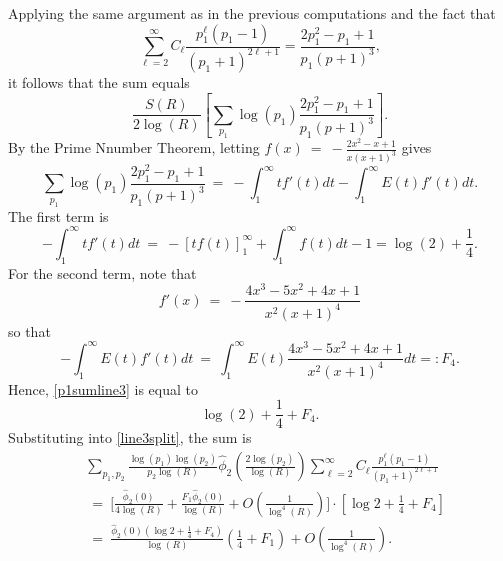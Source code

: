 \documentclass[11pt, reqno]{amsart}
\makeatletter
\renewenvironment{proof}[1][\proofname]{\par
  \vspace{-.7\topsep}%
  \pushQED{\qed}%
  \normalfont
  \topsep0pt \partopsep0pt %
  \trivlist
  \item[\hskip\labelsep
        \itshape
    #1\@addpunct{.}]\ignorespaces
}{%
  \popQED\endtrivlist\@endpefalse
  \addvspace{6pt plus 6pt} %
}
\theoremstyle{definition}
\theoremstyle{remark}
\numberwithin{equation}{section}
\renewcommand{\hat}{\widehat}
\makeatother
\begin{document}
\begin{proof}
    Applying the same argument as in the previous computations and the fact that
    \begin{equation}
        \sum_{\ell =2}^\infty C_\ell \frac{p_1^\ell (p_1-1)}{(p_1+1)^{2\ell+1}}=\frac{2p_1^2-p_1+1}{p_1(p+1)^3},
    \end{equation}
    it follows that the sum equals
    \begin{equation}\label{line3split}
        \frac{S(R)}{2\log(R)}\left[\sum_{p_1}\log(p_1) \frac{2p_1^2-p_1+1}{p_1(p+1)^3}\right].
    \end{equation}
By the Prime Nnumber Theorem, letting $f(x) \ = \ -\frac{2x^2-x+1}{x(x+1)^3}$ gives
\begin{equation}\label{p1sumline3}
    \sum_{p_1}\log(p_1) \frac{2p_1^2-p_1+1}{p_1(p+1)^3} \ =\ -\int_1^\infty tf'(t)dt-\int_1^\infty E(t)f'(t)dt.
\end{equation}
The first term is
\begin{equation}
    -\int_1^\infty tf'(t)dt \ = \ -[tf(t)]_1^\infty+\int_1^\infty f(t)dt-1=\log(2)+\frac{1}{4}.
\end{equation}
For the second term, note that
\begin{equation}
    f'(x) \ =\ -\frac{4x^{3} - 5x^{2} + 4x + 1}{x^{2} \left(x + 1\right)^{4}}
\end{equation}
so that
\begin{equation}
    -\int_1^\infty E(t)f'(t)dt \ = \ \int_1^\infty E(t)\frac{4x^{3} - 5x^{2} + 4x + 1}{x^{2} \left(x + 1\right)^{4}}dt=:F_4.
\end{equation}
Hence, \eqref{p1sumline3} is equal to
\begin{equation}
    \log (2)+\frac{1}{4}+F_4.
\end{equation}
Substituting into \eqref{line3split}, the sum is
    \begin{equation}
        \begin{aligned}
        & \sum_{p_1,p_2} \frac{\log(p_1)\log(p_2)}{p_2\log(R)}\hat\phi_2\left(\frac{2\log(p_2)}{\log(R)}\right) \sum_{\ell=2}^\infty C_\ell \frac{p_1^\ell(p_1-1)}{(p_1+1)^{2\ell +1}}\\
        & \ = \ \bigg[\frac{\hat\phi_2(0)}{4\log(R)}+\frac{F_1\hat\phi_2(0)}{\log(R)}+ O\left(\frac{1}{\log^4(R)}\right)\bigg]\cdot\left[\log 2 +\frac{1}{4}+F_4\right]\\
        & \ = \ \frac{\hat\phi_2(0)(\log 2+\frac{1}{4}+F_4)}{\log(R)}\left(\frac{1}{4}+F_1\right)+O\left(\frac{1}{\log^4(R)}\right). 
    \end{aligned}
\end{equation}
\end{proof}
\end{document}
